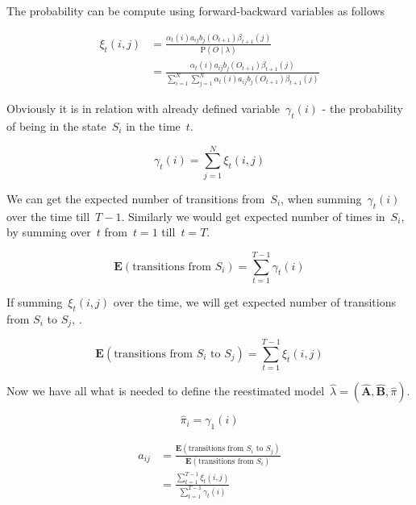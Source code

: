 \documentclass[thesis=M,english]{FITthesis}[2012/10/20]
\newcommand{\matr}[1]{\mathbf{#1}}
\begin{document}
The probability can be compute using forward-backward variables as follows
 
\begin{equation}
\begin{aligned}
\xi_t(i,j) &= \frac{ \alpha_t(i) a_{ij} b_j(O_{t+1}) \beta_{t+1}(j) }
		   		   { \mathrm{P}( O \mid \lambda ) } \\
		   &= \frac{ \alpha_t(i) a_{ij} b_j(O_{t+1}) \beta_{t+1}(j) }
		   		   { \sum\limits_{i=1}^N \sum\limits_{j=1}^N \alpha_t(i) a_{ij} b_j(O_{t+1}) \beta_{t+1}(j) }
\end{aligned}
\end{equation}

Obviously it is in relation with already defined variable~$\gamma_t(i)$ - the probability of being in the state~$S_i$ in the time~$t$.

\begin{equation}
\gamma_t(i) = \sum_{j=1}^N \xi_t(i,j)  
\end{equation}

We can get the expected number of transitions from~$S_i$, when summing~$\gamma_t(i)$ over the time till~$T-1$. Similarly we would get expected number of times in~$S_i$, by summing over~$t$ from~$t=1$ till~$t=T$. 

\begin{equation}
\mathbf{E}(\text{transitions from $S_i$}) = \sum_{t=1}^{T-1} \gamma_t(i)  
\end{equation}

If summing~$\xi_t(i,j)$ over the time, we will get expected number of transitions from $S_i$ to $S_j$, . 

\begin{equation}
\mathbf{E}(\text{transitions from $S_i$ to $S_j$}) = \sum_{t=1}^{T-1} \xi_t(i,j)  
\end{equation}

Now we have all what is needed to define the reestimated model~$\hat\lambda=(\hat{\matr{A}},\hat{\matr{B}},\hat\pi)$.

\begin{equation}
\hat\pi_i = \gamma_1(i)  
\end{equation}

\begin{equation}
\begin{aligned}
\hat a_{ij} &= \frac{\mathbf{E}(\text{transitions from $S_i$ to $S_j$})}
				   {\mathbf{E}(\text{transitions from $S_i$})}  \\
		    &= \frac{\sum\limits_{t=1}^{T-1} \xi_t(i,j)}{\sum\limits_{t=1}^{T-1} \gamma_t(i) }
\end{aligned}
\end{equation}
\end{document}
